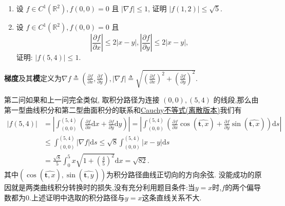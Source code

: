 \documentclass[../../main.tex]{subfiles}
\begin{document}
\begin{example}
\begin{enumerate}
\item 设 \( f \in C^1(\mathbb{R}^2), f(0,0) = 0 \) 且 \( |\nabla f| \leqslant 1 \), 证明 \( |f(1,2)| \leqslant \sqrt{5} \).

\item 设 \( f \in C^1(\mathbb{R}^2), f(0,0) = 0 \) 且
\[
\left| \frac{\partial f}{\partial x} \right| \leqslant 2|x - y|, \left| \frac{\partial f}{\partial y} \right| \leqslant 2|x - y|,
\]
证明: \( |f(5,4)| \leqslant 1 \).
\end{enumerate}
\end{example}
\begin{remark}
\textbf{梯度}及其\textbf{模}定义为$\nabla f\triangleq \left( \frac{\partial f}{\partial x},\frac{\partial f}{\partial y} \right) ,\left| \nabla f \right|\triangleq \sqrt{\left( \frac{\partial f}{\partial x} \right) ^2+\left( \frac{\partial f}{\partial y} \right) ^2}.$
\end{remark}
\begin{remark}
第二问如果和上一问完全类似, 取积分路径为连接 \( (0,0),(5,4) \) 的线段,那么由第一型曲线积分和第二型曲面积分的联系和\hyperref[theorem:Cauchy不等式]{Cauchy不等式(离散版本)}我们有
\[
\begin{aligned}
|f(5,4)|&=\left| \int_{(0,0)}^{(5,4)}{\left( \frac{\partial f}{\partial x}\mathrm{d}x+\frac{\partial f}{\partial y}\mathrm{d}y \right)} \right|=\left| \int_{(0,0)}^{(5,4)}{\left( \frac{\partial f}{\partial x}\cos \left( \widehat{\boldsymbol{t},x} \right) +\frac{\partial f}{\partial y}\sin \left( \widehat{\boldsymbol{t},x} \right) \right) \mathrm{d}s} \right|
\\
&\leqslant \int_{(0,0)}^{(5,4)}{|\nabla f|\mathrm{d}s}\leqslant \sqrt{8}\int_{(0,0)}^{(5,4)}{|x}-y|\mathrm{d}s
\\
&=\frac{\sqrt{8}}{5}\int_0^5{x\sqrt{1+\left( \frac{4}{5} \right) ^2}\mathrm{d}x}=\sqrt{82}.
\end{aligned}
\]
其中$\left( \cos \left( \widehat{\boldsymbol{t},x} \right) ,\sin \left( \widehat{\boldsymbol{t},y} \right) \right) $为积分路径曲线正切向的方向余弦.
没能成功的原因就是两类曲线积分转换时的损失,没有充分利用题目条件:当$y=x$时,$f$的两个偏导数都为0.上述证明中选取的积分路径与$y=x$这条直线关系不大.
\end{remark}
\end{document}
